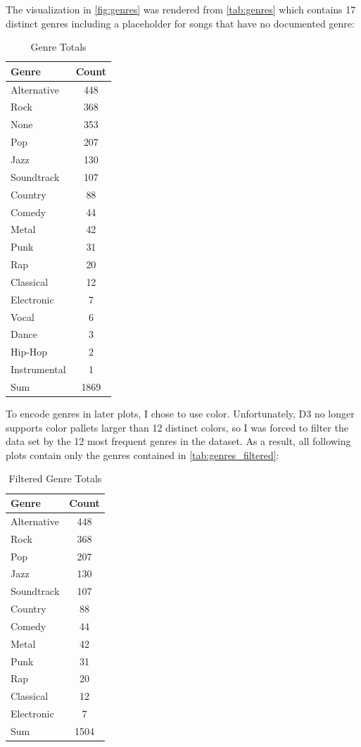 \documentclass[journal]{vgtc}                %
\begin{document}
The visualization in \autoref{fig:genres} was rendered from \autoref{tab:genres}
which contains 17 distinct genres including a placeholder for songs that have
no documented genre:

\begin{table}[h]
  \caption{Genre Totals}
  \label{tab:genres}
  \scriptsize%
	\centering%
  \begin{tabu}{l c}
  \toprule
    Genre & Count \\
  \midrule
    Alternative & 448 \\
    Rock & 368 \\
    None & 353 \\
    Pop & 207 \\
    Jazz & 130 \\
    Soundtrack & 107 \\
    Country & 88 \\
    Comedy & 44 \\
    Metal & 42 \\
    Punk & 31 \\
    Rap & 20 \\
    Classical & 12 \\
    Electronic & 7 \\
    Vocal & 6 \\
    Dance & 3 \\
    Hip-Hop & 2 \\
    Instrumental & 1 \\
  \midrule
    Sum & 1869 \\
  \bottomrule
  \end{tabu}%
\end{table}

To encode genres in later plots, I chose to use color. Unfortunately, D3 no
longer supports color pallets larger than 12 distinct colors, so I was forced
to filter the data set by the 12 most frequent genres in the dataset. As a
result, all following plots contain only the genres contained in
\autoref{tab:genres_filtered}:

\begin{table}[h]
  \caption{Filtered Genre Totals}
  \label{tab:genres_filtered}
  \scriptsize%
	\centering%
  \begin{tabu}{l c}
  \toprule
    Genre & Count \\
  \midrule
    Alternative & 448 \\
    Rock & 368 \\
    Pop & 207 \\
    Jazz & 130 \\
    Soundtrack & 107 \\
    Country & 88 \\
    Comedy & 44 \\
    Metal & 42 \\
    Punk & 31 \\
    Rap & 20 \\
    Classical & 12 \\
    Electronic & 7 \\
  \midrule
    Sum & 1504 \\
  \bottomrule
  \end{tabu}%
\end{table}
\end{document}
